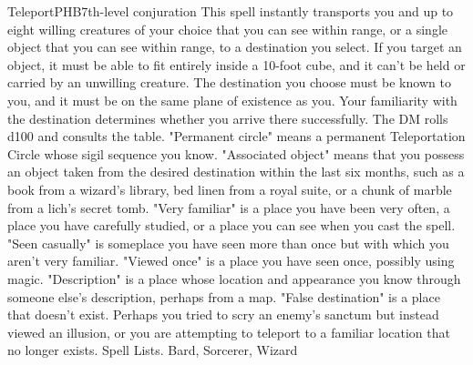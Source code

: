 \begin{spell}{Teleport}{PHB}{7th-level conjuration}
{
}
This spell instantly transports you and up to eight willing creatures of your choice that you can see within range, or a single object that you can see within range, to a destination you select. If you target an object, it must be able to fit entirely inside a 10-foot cube, and it can’t be held or carried by an unwilling creature.
The destination you choose must be known to you, and it must be on the same plane of existence as you. Your familiarity with the destination determines whether you arrive there successfully. The DM rolls d100 and consults the table.
"Permanent circle" means a permanent Teleportation Circle whose sigil sequence you know.
"Associated object" means that you possess an object taken from the desired destination within the last six months, such as a book from a wizard's library, bed linen from a royal suite, or a chunk of marble from a lich's secret tomb.
"Very familiar" is a place you have been very often, a place you have carefully studied, or a place you can see when you cast the spell.
"Seen casually" is someplace you have seen more than once but with which you aren't very familiar.
"Viewed once" is a place you have seen once, possibly using magic.
"Description" is a place whose location and appearance you know through someone else's description, perhaps from a map.
"False destination" is a place that doesn't exist. Perhaps you tried to scry an enemy's sanctum but instead viewed an illusion, or you are attempting to teleport to a familiar location that no longer exists.
Spell Lists. Bard, Sorcerer, Wizard
\end{spell}

